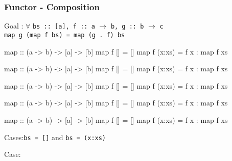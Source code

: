 \documentclass{beamer}
\newcommand{\ca}[1]{{\color{blue}#1}}
\newcommand{\cb}[1]{{\color{violet}#1}}
\newcommand{\cc}[1]{{\color{red}#1}}
\newcommand{\ce}[1]{{\color{green!50!black}#1}}
\begin{document}
\begin{frame}[t,fragile]
    \frametitle {Functor - Composition}

\begingroup
\color{gray}\fontsize{10}{9.8}\selectfont

Goal : $\forall$ \verb?bs :: [a], f :: a? $\rightarrow$ \verb?b, g :: b? $\rightarrow$ \verb?c? \\ 
    \quad \alert<3,21>{\Verb?map g (map f bs) = map (g . f) bs?}

\vspace{10pt}

\begin{overprint}

\begin{semiverbatim}
map :: (a -> b) -> [a] -> [b]
map f [] = []
map f (x:xs) = f x : map f xs
\end{semiverbatim}

\begin{semiverbatim}
map :: (a -> b) -> [a] -> [b]
map \ca{f} \cb{[]} = []
map f (x:xs) = f x : map f xs
\end{semiverbatim}

\begin{semiverbatim}
map :: (a -> b) -> [a] -> [b]
map \ca{f} \cb{[]} = \cb{[]}
map f (x:xs) = f x : map f xs
\end{semiverbatim}

\begin{semiverbatim}
map :: (a -> b) -> [a] -> [b]
map f [] = []
map \ca{f} (\cb{x}:\cc{xs}) = f x : map f xs
\end{semiverbatim}

\begin{semiverbatim}
map :: (a -> b) -> [a] -> [b]
map f [] = []
map \ca{f} (\cb{x}:\cc{xs}) = \ca{f} \cb{x} : map \ca{f} \cc{xs}
\end{semiverbatim}

\end{overprint}

\endgroup

\vspace{10pt}

\begin{overprint}

Cases:\quad\Verb?bs = []? \quad and \Verb?bs = (x:xs)?

Case:\quad{\ce{\Verb?bs = ?\alert<4>{\Verb?[]?}}} 


\end{overprint}
\end{frame}
\end{document}
